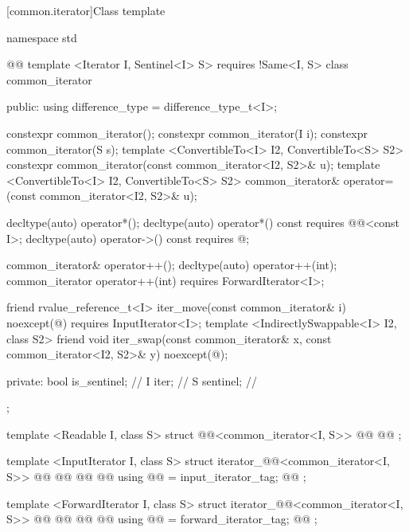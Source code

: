 [common.iterator]{Class template }

%
\begin{codeblock}
namespace std { @@
  template <Iterator I, Sentinel<I> S>
    requires !Same<I, S>
  class common_iterator {
  public:
    using difference_type = difference_type_t<I>;

    constexpr common_iterator();
    constexpr common_iterator(I i);
    constexpr common_iterator(S s);
    template <ConvertibleTo<I> I2, ConvertibleTo<S> S2>
      constexpr common_iterator(const common_iterator<I2, S2>& u);
    template <ConvertibleTo<I> I2, ConvertibleTo<S> S2>
      common_iterator& operator=(const common_iterator<I2, S2>& u);

    decltype(auto) operator*();
    decltype(auto) operator*() const
      requires @@<const I>;
    decltype(auto) operator->() const
      requires @\seebelow@;

    common_iterator& operator++();
    decltype(auto) operator++(int);
    common_iterator operator++(int)
      requires ForwardIterator<I>;

    friend rvalue_reference_t<I> iter_move(const common_iterator& i)
      noexcept(@\seebelow@)
        requires InputIterator<I>;
    template <IndirectlySwappable<I> I2, class S2>
      friend void iter_swap(const common_iterator& x, const common_iterator<I2, S2>& y)
        noexcept(@\seebelow@);

  private:
    bool is_sentinel; // \expos
    I iter;           // \expos
    S sentinel;       // \expos
  };

  template <Readable I, class S>
  struct @@<common_iterator<I, S>> {
    @@
    @@
  };

  template <InputIterator I, class S>
  struct iterator_@@<common_iterator<I, S>> {
    @@
    @@
    @@
    @@
    using @@ = input_iterator_tag;
    @@
  };

  template <ForwardIterator I, class S>
  struct iterator_@@<common_iterator<I, S>> {
    @@
    @@
    @@
    @@
    using @@ = forward_iterator_tag;
    @@
  };

}
\end{codeblock}
